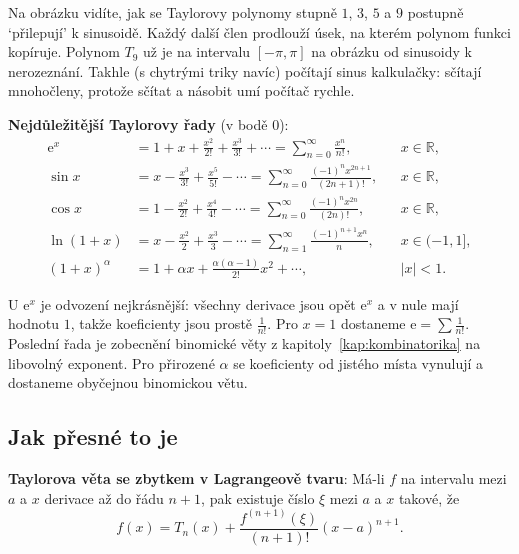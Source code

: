Na obrázku vidíte, jak se Taylorovy polynomy stupně $1$, $3$, $5$ a $9$ postupně `přilepují' k sinusoidě. Každý další člen prodlouží úsek, na kterém polynom funkci kopíruje. Polynom $T_9$ už je na intervalu $[-\pi, \pi]$ na obrázku od sinusoidy k nerozeznání. Takhle (s chytrými triky navíc) počítají sinus kalkulačky: sčítají mnohočleny, protože sčítat a násobit umí počítač rychle.

\begin{definitionbox}
  \textbf{Nejdůležitější Taylorovy řady} (v bodě $0$):
  \begin{align*}
    \mathrm{e}^x &= 1 + x + \frac{x^2}{2!} + \frac{x^3}{3!} + \cdots = \sum_{n=0}^{\infty}\frac{x^n}{n!}, & &x\in\mathbb{R},\\
    \sin x &= x - \frac{x^3}{3!} + \frac{x^5}{5!} - \cdots = \sum_{n=0}^{\infty}\frac{{(-1)}^nx^{2n+1}}{(2n + 1)!}, & &x\in\mathbb{R},\\
    \cos x &= 1 - \frac{x^2}{2!} + \frac{x^4}{4!} - \cdots = \sum_{n=0}^{\infty}\frac{{(-1)}^nx^{2n}}{(2n)!}, & &x\in\mathbb{R},\\
    \ln(1 + x) &= x - \frac{x^2}{2} + \frac{x^3}{3} - \cdots = \sum_{n=1}^{\infty}\frac{{(-1)}^{n+1}x^n}{n}, & &x\in(-1, 1],\\
    {(1 + x)}^{\alpha} &= 1 + \alpha x + \frac{\alpha(\alpha - 1)}{2!}x^2 + \cdots, & &|x| < 1.
  \end{align*}
\end{definitionbox}

U $\mathrm{e}^x$ je odvození nejkrásnější: všechny derivace jsou opět $\mathrm{e}^x$ a v nule mají hodnotu $1$, takže koeficienty jsou prostě $\frac{1}{n!}$. Pro $x = 1$ dostaneme $\mathrm{e} = \sum\frac{1}{n!}$. Poslední řada je zobecnění binomické věty z kapitoly~\ref{kap:kombinatorika} na libovolný exponent. Pro přirozené $\alpha$ se koeficienty od jistého místa vynulují a dostaneme obyčejnou binomickou větu.

\subsection{Jak přesné to je}

\begin{definitionbox}
  \textbf{Taylorova věta se zbytkem v Lagrangeově tvaru}: Má-li $f$ na intervalu mezi $a$ a $x$ derivace až do řádu $n + 1$, pak existuje číslo $\xi$ mezi $a$ a $x$ takové, že
  \begin{equation*}
    f(x) = T_n(x) + \frac{f^{(n+1)}(\xi)}{(n + 1)!}{(x - a)}^{n+1}.
  \end{equation*}
\end{definitionbox}

